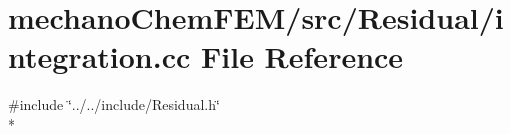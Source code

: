 \section{mechano\-Chem\-F\-E\-M/src/\-Residual/integration.cc File Reference}
\label{integration_8cc}
{\ttfamily \#include \char`\"{}../../include/\-Residual.\-h\char`\"{}}\\*
